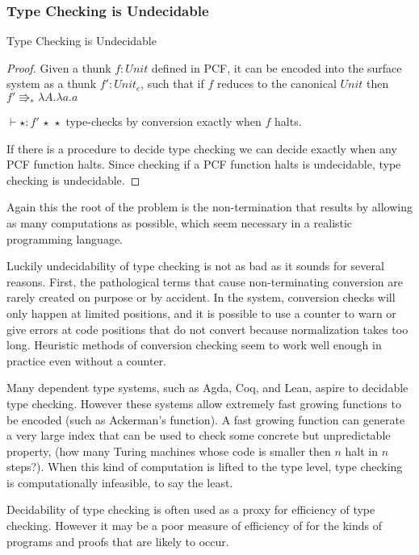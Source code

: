 \subsubsection{Type Checking is Undecidable}
\begin{thm}
Type Checking is Undecidable
\end{thm}
 
\begin{proof}
Given a thunk $f:Unit$ defined in PCF, it can be encoded into the surface system as a thunk $f':Unit_{c}$, such that if $f$ reduces to the canonical $Unit$ then $f'\Rrightarrow_{\ast}\lambda A.\lambda a.a$
 
$\vdash\star:f'\,\star\,\star$ type-checks by conversion exactly when $f$ halts.
 
If there is a procedure to decide type checking we can decide exactly when any PCF function halts.
Since checking if a PCF function halts is undecidable, type checking is undecidable.
 
\end{proof}
 
Again this the root of the problem is the non-termination that results by allowing as many computations as possible, which seem necessary in a realistic programming language.
 
Luckily undecidability of type checking is not as bad as it sounds for several reasons.
First, the pathological terms that cause non-terminating conversion are rarely created on purpose or by accident.
In the \bidir{} system, conversion checks will only happen at limited positions, and it is possible to use a counter to warn or give errors at code positions that do not convert because normalization takes too long.
Heuristic methods of conversion checking seem to work well enough in practice even without a counter.
 
Many dependent type systems, such as Agda, Coq, and Lean, aspire to decidable type checking.
However these systems allow extremely fast growing functions to be encoded (such as Ackerman's function).
A fast growing function can generate a very large index that can be used to check some concrete but unpredictable property, (how many Turing machines whose code is smaller then $n$ halt in $n$ steps?).
When this kind of computation is lifted to the type level, type checking is computationally infeasible, to say the least.
 
Decidability of type checking is often used as a proxy for efficiency of type checking.
However it may be a poor measure of efficiency of for the kinds of programs and proofs that are likely to occur.
 

